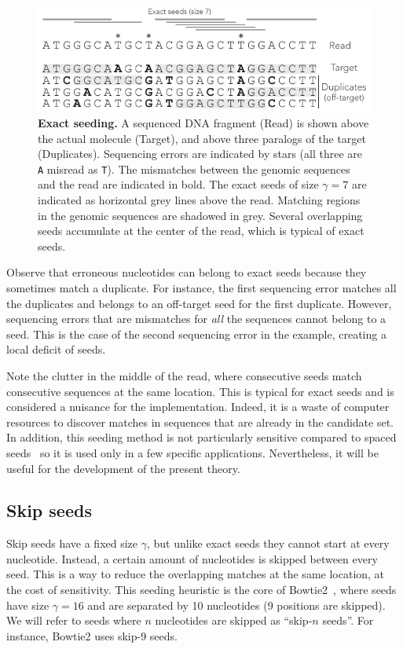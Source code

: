\documentclass{article}
\begin{document}
\begin{figure}[h]
\centering
\includegraphics[scale=1]{exact_seed_example.pdf}
\caption{\textbf{Exact seeding.}
A sequenced DNA fragment (Read) is shown above the actual molecule
(Target), and above three paralogs of the target (Duplicates). Sequencing
errors are indicated by stars (all three are \texttt{A} misread as
\texttt{T}). The mismatches between the genomic sequences and the read are
indicated in bold. The exact seeds of size $\gamma = 7$ are indicated as
horizontal grey lines above the read. Matching regions in the genomic
sequences are shadowed in grey. Several overlapping seeds accumulate at
the center of the read, which is typical of exact seeds.}
\label{fig:exact_seed_example}
\end{figure}

Observe that erroneous nucleotides can belong to exact seeds because they
sometimes match a duplicate. For instance, the first sequencing error
matches all the duplicates and belongs to an off-target seed for the first
duplicate. However, sequencing errors that are mismatches for \emph{all}
the sequences cannot belong to a seed. This is the case of the second
sequencing error in the example, creating a local deficit of seeds.

Note the clutter in the middle of the read, where consecutive seeds match
consecutive sequences at the same location. This is typical for exact
seeds and is considered a nuisance for the implementation. Indeed, it is a
waste of computer resources to discover matches in sequences that are
already in the candidate set. In addition, this seeding method is not
particularly sensitive compared to spaced seeds~\cite{pmid11934743} so it
is used only in a few specific applications. Nevertheless, it will be
useful for the development of the present theory.


\subsection{Skip seeds}

Skip seeds have a fixed size $\gamma$, but unlike exact seeds they cannot
start at every nucleotide. Instead, a certain amount of nucleotides is
skipped between every seed. This is a way to reduce the overlapping
matches at the same location, at the cost of sensitivity. This seeding
heuristic is the core of Bowtie2~\cite{pmid22388286}, where seeds have
size $\gamma=16$ and are separated by 10 nucleotides (9 positions are
skipped). We will refer to seeds where $n$ nucleotides are skipped as
``skip-$n$ seeds''. For instance, Bowtie2 uses skip-9 seeds.
\end{document}
